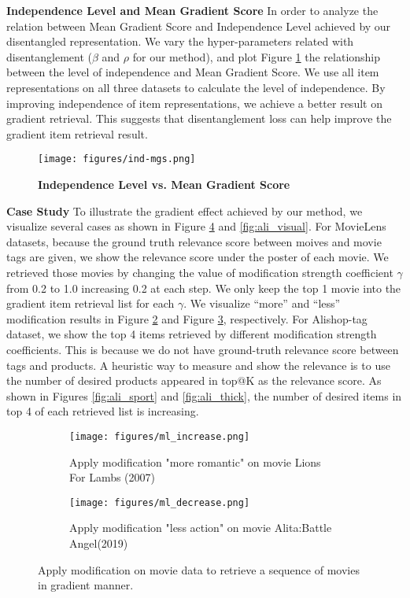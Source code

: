 \textbf{Independence Level and Mean Gradient Score}
In order to analyze the relation between Mean Gradient Score and Independence Level achieved by our disentangled representation. We vary the hyper-parameters related with disentanglement ($\beta$ and $\rho$ for our method), and plot Figure \ref{fig:ind-mgs} the relationship between the level of independence and Mean Gradient Score. We use all item representations on all three datasets to calculate the level of independence. By improving independence of item representations, we achieve a better result on gradient retrieval. This suggests that disentanglement loss can help improve the gradient item retrieval result.  


\begin{figure}[ht]
\centering
\texttt{[image: figures/ind-mgs.png]}
\caption{\textbf{Independence Level vs. Mean Gradient Score}}
\label{fig:ind-mgs}
\end{figure}


\textbf{Case Study}
To illustrate the gradient effect achieved by our method, we visualize several cases as shown in Figure \ref{fig:ml_visual} and \ref{fig:ali_visual}. For MovieLens datasets, because the ground truth relevance score between moives and movie tags are given, we show the relevance score under the poster of each movie. We retrieved those movies by changing the value of modification strength coefficient $\gamma$ from 0.2 to 1.0 increasing 0.2 at each step. We only keep the top 1 movie into the gradient item retrieval list for each $\gamma$. We visualize ``more'' and ``less'' modification results in Figure \ref{fig:ml_increase} and Figure \ref{fig:ml_decrease}, respectively. For Alishop-tag dataset, we show the top 4 items retrieved by different modification strength coefficients. This is because we do not have ground-truth relevance score between tags and products. A heuristic way to measure and show the relevance is to use the number of desired products appeared in top@K as the relevance score. As shown in Figures \ref{fig:ali_sport} and \ref{fig:ali_thick}, the number of desired items in top 4 of each retrieved list is increasing.



\begin{figure}[ht]
\centering
\begin{subfigure}[b]{0.45\textwidth}
   \texttt{[image: figures/ml\_increase.png]}
   \caption{Apply modification "more romantic" on movie Lions For Lambs (2007)}
   \label{fig:ml_increase} 
\end{subfigure}

\begin{subfigure}[b]{0.45\textwidth}
   \texttt{[image: figures/ml\_decrease.png]}
   \caption{Apply modification "less action" on movie Alita:Battle Angel(2019)}
   \label{fig:ml_decrease}
\end{subfigure}
\caption{Apply modification on movie data to retrieve a sequence of movies in gradient manner.}
\label{fig:ml_visual}
\end{figure}




